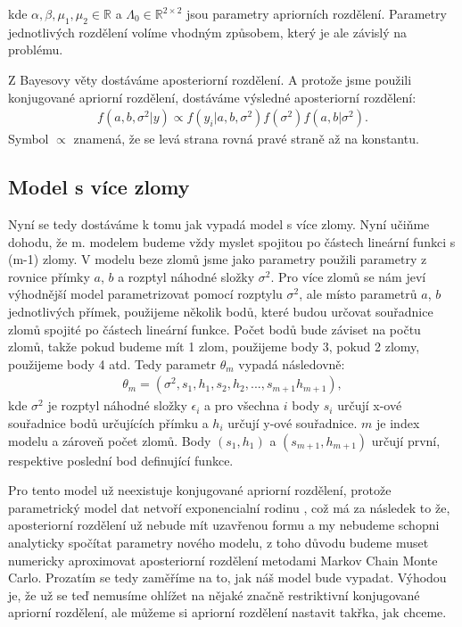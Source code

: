 \documentclass[czech,master,public,dept470,male,cpdeclaration,oneside, python]{diploma}
\begin{document}
kde $\alpha, \beta, \mu_1, \mu_2 \in \mathbb{R}$ a $\Lambda_0 \in \mathbb{R}^{2\times2}$ jsou parametry apriorních rozdělení. Parametry jednotlivých rozdělení volíme vhodným způsobem, který je ale závislý na problému. \par
Z Bayesovy věty dostáváme aposteriorní rozdělení. A protože jsme použili konjugované apriorní rozdělení, dostáváme výsledné aposteriorní rozdělení:
\begin{align}
	f(a, b, \sigma^2 | y) \propto f(y_i | a, b, \sigma^2)f(\sigma^2)f(a,b | \sigma^2).
\end{align}
Symbol $\propto$ znamená, že se levá strana rovná pravé straně až na konstantu.
\subsection{Model s více zlomy}
Nyní se tedy dostáváme k tomu jak vypadá model s více zlomy. Nyní učiňme dohodu, že m. modelem budeme vždy myslet spojitou po částech lineární funkci s (m-1) zlomy. V modelu beze zlomů jsme jako parametry použili parametry z rovnice přímky $a$, $b$ a rozptyl náhodné složky $\sigma^2$. Pro více zlomů se nám jeví výhodnější model parametrizovat pomocí rozptylu $\sigma^2$, ale místo parametrů $a$, $b$ jednotlivých přímek, použijeme několik bodů, které budou určovat souřadnice zlomů spojité po částech lineární funkce.  Počet bodů bude záviset na počtu zlomů, takže pokud budeme mít 1 zlom, použijeme body 3, pokud 2 zlomy, použijeme body 4 atd. Tedy parametr $\theta_m$ vypadá následovně:
\begin{align}
\theta_m = (\sigma^2, s_1, h_1, s_2, h_2, ..., s_{m+1} h_{m+1}),
\end{align}
kde $\sigma^2$ je rozptyl náhodné složky $\epsilon_i$ a pro všechna $i$ body $s_i$ určují x-ové souřadnice bodů určujících přímku a $h_i$ určují y-ové souřadnice. $m$ je index modelu a zároveň počet zlomů. Body $(s_1, h_1)$ a $(s_{m+1}, h_{m+1})$ určují první, respektive poslední bod definující funkce.\par
Pro tento model už neexistuje konjugované apriorní rozdělení, protože parametrický model dat netvoří exponencialní rodinu \cite{b}, což má za následek to že, aposteriorní rozdělení už nebude mít uzavřenou formu a my nebudeme schopni analyticky spočítat parametry nového modelu, z toho důvodu budeme muset numericky aproximovat aposteriorní rozdělení metodami Markov Chain Monte Carlo. Prozatím se tedy zaměříme na to, jak náš model bude vypadat. Výhodou je, že už se teď nemusíme ohlížet na nějaké značně restriktivní konjugované apriorní rozdělení, ale můžeme si apriorní rozdělení nastavit takřka, jak chceme.\par
\end{document}
